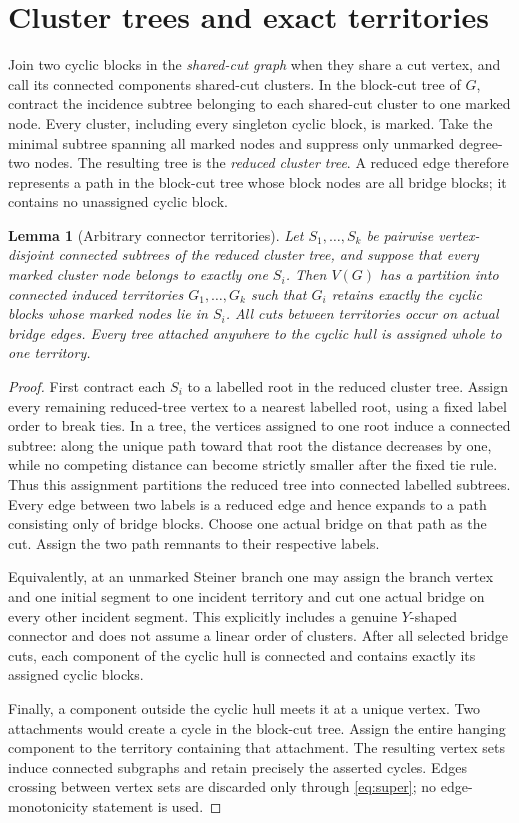\documentclass[11pt]{article}
\newtheorem{lemma}[theorem]{Lemma}
\begin{document}
\section{Cluster trees and exact territories}

Join two cyclic blocks in the \emph{shared-cut graph} when they share a cut
vertex, and call its connected components shared-cut clusters.  In the
block-cut tree of $G$, contract the incidence subtree belonging to each
shared-cut cluster to one marked node.  Every cluster, including every
singleton cyclic block, is marked.  Take the minimal subtree spanning all
marked nodes and suppress only unmarked degree-two nodes.  The resulting tree
is the \emph{reduced cluster tree}.  A reduced edge therefore represents a
path in the block-cut tree whose block nodes are all bridge blocks; it contains
no unassigned cyclic block.

\begin{lemma}[Arbitrary connector territories]\label{lem:territories}
Let $S_1,\ldots,S_k$ be pairwise vertex-disjoint connected subtrees of the
reduced cluster tree, and suppose that every marked cluster node belongs to
exactly one $S_i$.  Then $V(G)$ has a partition into connected induced
territories $G_1,\ldots,G_k$ such that $G_i$ retains exactly the cyclic blocks
whose marked nodes lie in $S_i$.  All cuts between territories occur on
actual bridge edges.  Every tree attached anywhere to the cyclic hull is
assigned whole to one territory.
\end{lemma}

\begin{proof}
First contract each $S_i$ to a labelled root in the reduced cluster tree.
Assign every remaining reduced-tree vertex to a nearest labelled root, using
a fixed label order to break ties.  In a tree, the vertices assigned to one
root induce a connected subtree: along the unique path toward that root the
distance decreases by one, while no competing distance can become strictly
smaller after the fixed tie rule.  Thus this assignment partitions the
reduced tree into connected labelled subtrees.  Every edge between two labels
is a reduced edge and hence expands to a path consisting only of bridge blocks.
Choose one actual bridge on that path as the cut.  Assign the two path remnants
to their respective labels.

Equivalently, at an unmarked Steiner branch one may assign the branch vertex
and one initial segment to one incident territory and cut one actual bridge on
every other incident segment.  This explicitly includes a genuine $Y$-shaped
connector and does not assume a linear order of clusters.  After all selected
bridge cuts, each component of the cyclic hull is connected and contains
exactly its assigned cyclic blocks.

Finally, a component outside the cyclic hull meets it at a unique vertex.  Two
attachments would create a cycle in the block-cut tree.  Assign the entire
hanging component to the territory containing that attachment.  The resulting
vertex sets induce connected subgraphs and retain precisely the asserted
cycles.  Edges crossing between vertex sets are discarded only through
\eqref{eq:super}; no edge-monotonicity statement is used.
\end{proof}
\end{document}
